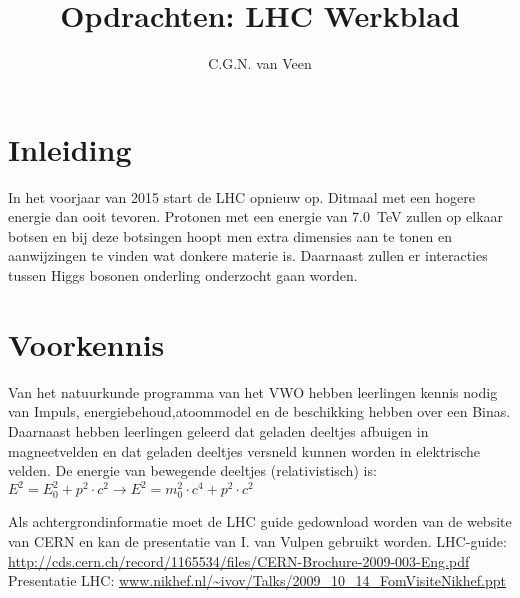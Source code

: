 

\usepackage{hepnames} 
\usepackage[version=3]{mhchem}
\usepackage{lipsum}
\usepackage{pgfplots}
\usepackage{amsmath}
\usepackage{tikz}
\usetikzlibrary{shapes}
\usetikzlibrary{positioning,arrows}
\usetikzlibrary{decorations.pathmorphing}
\usetikzlibrary{decorations.markings}


\DeclareRobustCommand{\PgDpp}{\HepParticle{\Delta}{}{++}\xspace}

\title{Opdrachten: LHC Werkblad} 
\author{C.G.N. van Veen}



\maketitle

\section{Inleiding} In het voorjaar van 2015 start de LHC opnieuw op. Ditmaal 
met een hogere energie dan ooit tevoren. Protonen met een energie van \SI{7.0}{\tera\electronvolt}
zullen op elkaar botsen en bij deze botsingen hoopt men extra dimensies aan te tonen en 
aanwijzingen te vinden wat donkere materie is. Daarnaast zullen er interacties tussen Higgs bosonen onderling 
onderzocht gaan worden.

\section{Voorkennis}

Van het natuurkunde programma van het VWO hebben leerlingen kennis nodig van Impuls, 
energiebehoud,atoommodel en de beschikking hebben over een Binas.
Daarnaast hebben leerlingen geleerd dat geladen deeltjes afbuigen in magneetvelden en dat 
geladen deeltjes versneld kunnen worden in elektrische velden.
De energie van bewegende deeltjes (relativistisch) is:\\
$E^2 = E_0^2 + p^2 \cdot c^2 \rightarrow  E^2 = m_0^2 \cdot c^4 + p^2 \cdot c^2 $

Als achtergrondinformatie moet de LHC guide gedownload worden van de 
website van CERN en kan de presentatie van I. van Vulpen gebruikt worden. 
LHC-guide: \url{http://cds.cern.ch/record/1165534/files/CERN-Brochure-2009-003-Eng.pdf}
Presentatie LHC: \url{www.nikhef.nl/~ivov/Talks/2009_10_14_FomVisiteNikhef.ppt}

